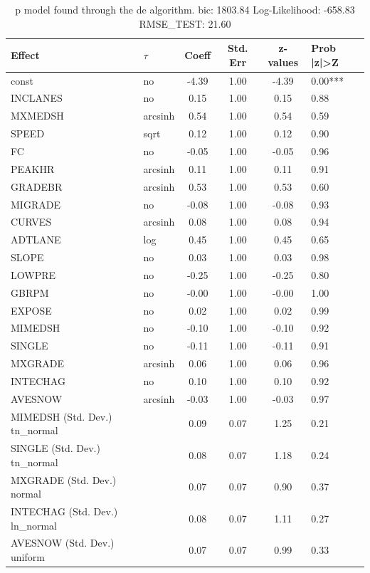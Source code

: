 \begin{table}
	\caption{p model found through the de algorithm. bic: 1803.84 Log-Likelihood: -658.83 RMSE_TEST: 21.60}
	\begin{center}
		\begin{tabular}{|l|l|c|c|c|l|}
			\hline
			Effect & $\tau$ & Coeff & Std. Err & z-values & Prob |z|>Z \\
			\hline
			const & no & -4.39 & 1.00 & -4.39 & 0.00*** \\
			\hline
			INCLANES & no & 0.15 & 1.00 & 0.15 & 0.88 \\
			\hline
			MXMEDSH & arcsinh & 0.54 & 1.00 & 0.54 & 0.59 \\
			\hline
			SPEED & sqrt & 0.12 & 1.00 & 0.12 & 0.90 \\
			\hline
			FC & no & -0.05 & 1.00 & -0.05 & 0.96 \\
			\hline
			PEAKHR & arcsinh & 0.11 & 1.00 & 0.11 & 0.91 \\
			\hline
			GRADEBR & arcsinh & 0.53 & 1.00 & 0.53 & 0.60 \\
			\hline
			MIGRADE & no & -0.08 & 1.00 & -0.08 & 0.93 \\
			\hline
			CURVES & arcsinh & 0.08 & 1.00 & 0.08 & 0.94 \\
			\hline
			ADTLANE & log & 0.45 & 1.00 & 0.45 & 0.65 \\
			\hline
			SLOPE & no & 0.03 & 1.00 & 0.03 & 0.98 \\
			\hline
			LOWPRE & no & -0.25 & 1.00 & -0.25 & 0.80 \\
			\hline
			GBRPM & no & -0.00 & 1.00 & -0.00 & 1.00 \\
			\hline
			EXPOSE & no & 0.02 & 1.00 & 0.02 & 0.99 \\
			\hline
			MIMEDSH & no & -0.10 & 1.00 & -0.10 & 0.92 \\
			\hline
			SINGLE & no & -0.11 & 1.00 & -0.11 & 0.91 \\
			\hline
			MXGRADE & arcsinh & 0.06 & 1.00 & 0.06 & 0.96 \\
			\hline
			INTECHAG & no & 0.10 & 1.00 & 0.10 & 0.92 \\
			\hline
			AVESNOW & arcsinh & -0.03 & 1.00 & -0.03 & 0.97 \\
			\hline
			MIMEDSH (Std. Dev.) tn_normal &  & 0.09 & 0.07 & 1.25 & 0.21 \\
			\hline
			SINGLE (Std. Dev.) tn_normal &  & 0.08 & 0.07 & 1.18 & 0.24 \\
			\hline
			MXGRADE (Std. Dev.) normal &  & 0.07 & 0.07 & 0.90 & 0.37 \\
			\hline
			INTECHAG (Std. Dev.) ln_normal &  & 0.08 & 0.07 & 1.11 & 0.27 \\
			\hline
			AVESNOW (Std. Dev.) uniform &  & 0.07 & 0.07 & 0.99 & 0.33 \\
			\hline
		\end{tabular}
	\end{center}
\end{table}